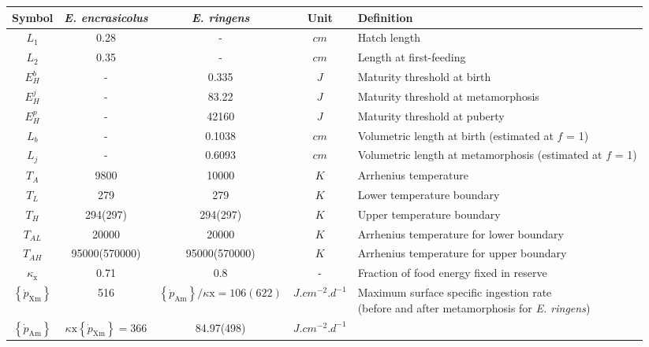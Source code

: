 \begin{table}[H]
\centering
\begin{adjustbox}{width=1.2\textwidth}
\begin{tabular}{c|c|c|c|l}
\hline
Symbol      & \textit{E. encrasicolus} & \textit{E. ringens}   & Unit   & Definition\\
\hline
$L_{1}$     & 0.28    & -        & $cm$     & Hatch length\\
$L_{2}$     & 0.35    & -        & $cm$     & Length at first-feeding\\
$E_{H}^{b}$ & -       & 0.335    & $J$      & Maturity threshold at birth\\
$E_{H}^{j}$ & -       & 83.22    & $J$      & Maturity threshold at metamorphosis\\
$E_{H}^{p}$ & -       & 42160    & $J$      & Maturity threshold at puberty\\
$L_{b}$      & - & 0.1038        & $cm$ & Volumetric length at birth (estimated at $f$ = 1)\\
$L_{j}$      & - & 0.6093        & $cm$ & Volumetric length at metamorphosis (estimated at $f$ = 1) \\
$T_{A}$     & 9800     & 10000   & $K$      & Arrhenius temperature\\
$T_{L}$     & 279      & 279     & $K$      & Lower temperature boundary\\
$T_{H}$     & 294(297) & 294(297)& $K$      & Upper temperature boundary\\
$T_{AL}$    & 20000    & 20000   & $K$      & Arrhenius temperature for lower boundary\\
$T_{AH}$    & 95000(570000)      & 95000(570000) & $K$ & Arrhenius temperature for upper boundary\\
$\kappa_{\mathrm{x}} $
	& 0.71
	& 0.8
	& -
	& Fraction of food energy fixed in reserve\\
$\left \{ \dot{p}_\mathrm{Xm} \right \}$
	& 516
	& $\left \{ \dot{p}_\mathrm{Am} \right \}/\kappa \mathrm{x} = 106(622)$
	& $J.cm^{-2}.d^{-1}$
	& \makecell[l]{Maximum surface specific ingestion rate \\ (before and after metamorphosis for \textit{E. ringens})} \\
$\left \{ \dot{p}_\mathrm{Am} \right \}$
	& $ \kappa \mathrm{x} \left \{ \dot{p}_\mathrm{Xm} \right \}= 366$
	& 84.97(498)
	& $J.cm^{-2}.d^{-1}$

\end{tabular}
\end{adjustbox}
\end{table}
